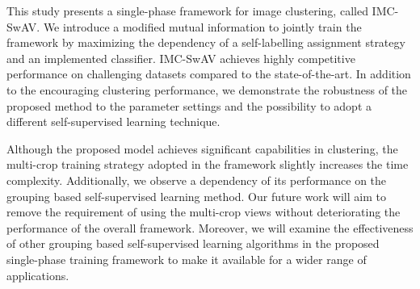 \documentclass[journal]{IEEEtran}
\begin{document}
This study presents a single-phase framework for image clustering, called IMC-SwAV.  We introduce a modified mutual information to jointly train the framework by maximizing the dependency of a self-labelling assignment strategy and an implemented classifier. IMC-SwAV achieves highly competitive performance on challenging datasets compared to the state-of-the-art. In addition to the encouraging clustering performance, we demonstrate the robustness of the proposed method to the parameter settings and the possibility to adopt a different self-supervised learning technique. \par


Although the proposed model achieves significant capabilities in clustering, the multi-crop training strategy adopted in the framework slightly increases the time complexity. Additionally, we observe a dependency of its performance on the grouping based self-supervised learning method. Our future work will aim to remove the requirement of using the multi-crop views without deteriorating the performance of the overall framework. Moreover, we will examine the effectiveness of other grouping based self-supervised learning algorithms in the proposed single-phase training framework to make it available for a wider range of applications.
\end{document}
